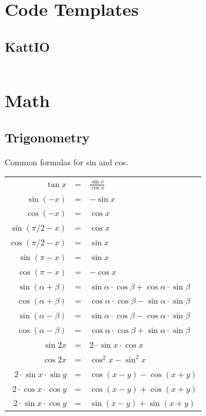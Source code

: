 \documentclass[8pt,a4paper,landscape,oneside]{amsart}
\newcommand{\code}[1]{\inputminted[fontsize=\normalsize,baselinestretch=1]{java}{code/#1}}
\begin{document}
\begin{multicols*}{3}
\thispagestyle{fancy}
\vspace{-3em}

\tableofcontents


\section{Code Templates}
  \subsection{KattIO}
  \code{Kattio.java}

\section{Math}
  \subsection{Trigonometry}
  Common formulas for sin and cos.
  \begin{center}
  \begin{tabular}{rcl}
  \hline
  $\tan x$ & = & $\frac{\sin x}{\cos x}$ \\
  $\sin(-x)$ & = & $-\sin x$ \\
  $\cos(-x)$ & = & $\cos x$ \\
  $\sin(\pi/2-x)$ & = & $\cos x$ \\
  $\cos(\pi/2-x)$ & = & $\sin x$ \\
  $\sin(\pi-x)$ & = & $\sin x$ \\
  $\cos(\pi-x)$ & = & $-\cos x$ \\
  \hline
  $\sin(\alpha+\beta)$ & = & $\sin\alpha \cdot \cos\beta + \cos\alpha \cdot \sin\beta$ \\
  $\cos(\alpha+\beta)$ & = & $\cos\alpha \cdot \cos\beta - \sin\alpha \cdot \sin\beta$ \\
  $\sin(\alpha-\beta)$ & = & $\sin\alpha \cdot \cos\beta - \cos\alpha \cdot \sin\beta$ \\
  $\cos(\alpha-\beta)$ & = & $\cos\alpha \cdot \cos\beta + \sin\alpha \cdot \sin\beta$ \\
  \hline
  $\sin 2x$ & = & $2 \cdot \sin x \cdot \cos x$ \\
  $\cos 2x$ & = & $\cos^2 x - \sin^2 x$ \\
  $2 \cdot \sin x \cdot \sin y$ & = & $\cos(x-y) - \cos(x+y)$ \\
  $2 \cdot \cos x \cdot \cos y$ & = & $\cos(x-y) + \cos(x+y)$ \\
  $2 \cdot \sin x \cdot \cos y$ & = & $\sin(x-y) + \sin(x+y)$ \\ \hline
  \end{tabular}
  \end{center}
  

\end{multicols*}
\end{document}

